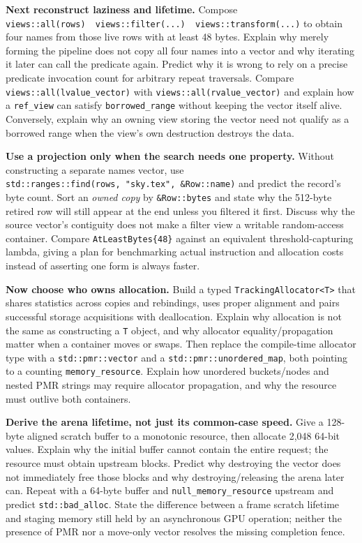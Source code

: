 \textbf{Next reconstruct laziness and lifetime.} Compose \texttt{views::all(rows)\ \textbar{}\ views::filter(...)\ \textbar{}\ views::transform(...)} to obtain four names from those live rows with at least 48 bytes. Explain why merely forming the pipeline does not copy all four names into a vector and why iterating it later can call the predicate again. Predict why it is wrong to rely on a precise predicate invocation count for arbitrary repeat traversals. Compare \texttt{views::all(lvalue\_vector)} with \texttt{views::all(rvalue\_vector)} and explain how a \texttt{ref\_view} can satisfy \texttt{borrowed\_range} without keeping the vector itself alive. Conversely, explain why an owning view storing the vector need not qualify as a borrowed range when the view's own destruction destroys the data.

\textbf{Use a projection only when the search needs one property.} Without constructing a separate names vector, use \texttt{std::ranges::find(rows,\ "sky.tex",\ \&Row::name)} and predict the record's byte count. Sort an \emph{owned copy} by \texttt{\&Row::bytes} and state why the 512-byte retired row will still appear at the end unless you filtered it first. Discuss why the source vector's contiguity does not make a filter view a writable random-access container. Compare \texttt{AtLeastBytes\{48\}} against an equivalent threshold-capturing lambda, giving a plan for benchmarking actual instruction and allocation costs instead of asserting one form is always faster.

\textbf{Now choose who owns allocation.} Build a typed \texttt{TrackingAllocator\textless{}T\textgreater{}} that shares statistics across copies and rebindings, uses proper alignment and pairs successful storage acquisitions with deallocation. Explain why allocation is not the same as constructing a \texttt{T} object, and why allocator equality/propagation matter when a container moves or swaps. Then replace the compile-time allocator type with a \texttt{std::pmr::vector} and a \texttt{std::pmr::unordered\_map}, both pointing to a counting \texttt{memory\_resource}. Explain how unordered buckets/nodes and nested PMR strings may require allocator propagation, and why the resource must outlive both containers.

\textbf{Derive the arena lifetime, not just its common-case speed.} Give a 128-byte aligned scratch buffer to a monotonic resource, then allocate 2,048 64-bit values. Explain why the initial buffer cannot contain the entire request; the resource must obtain upstream blocks. Predict why destroying the vector does not immediately free those blocks and why destroying/releasing the arena later can. Repeat with a 64-byte buffer and \texttt{null\_memory\_resource} upstream and predict \texttt{std::bad\_alloc}. State the difference between a frame scratch lifetime and staging memory still held by an asynchronous GPU operation; neither the presence of PMR nor a move-only vector resolves the missing completion fence.

